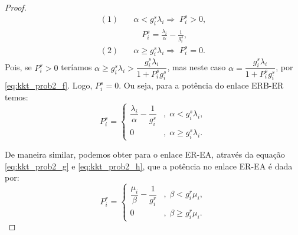\begin{proof}
    \begin{align}
    (1)\quad     &\alpha < g_i^s\lambda_i \Rightarrow\; P_i^s > 0 ,\\
                &\quad P_i^s = \frac{\lambda_i}{\alpha} - \frac{1}{g_i^s},\\
    (2)\quad     &\alpha \geq g_i^s\lambda_i \Rightarrow\; P_i^s = 0.
    \end{align}
    Pois, se $P_i^s > 0$ teríamos $\alpha \geq g_i^s\lambda_i > \dfrac{g_i^s\lambda_i}{1 + P_i^sg_i^s}$, mas neste caso $\alpha =\dfrac{g_i^s\lambda_i}{1 + P_i^sg_i^s}$, por \eqref{eq:kkt_prob2_f}. Logo, $P_i^s = 0$. Ou seja, para a potência do enlace \ac{ERB}-\ac{ER} temos:
    \begin{equation}\label{eq_pot_sr}
    P_i^s=
        \begin{cases}
          \dfrac{\lambda_i}{\alpha} - \dfrac{1}{g_i^s} &,\; \alpha < g_i^s\lambda_i,\\
          0 &,\; \alpha \geq g_i^s\lambda_i.
        \end{cases}
    \end{equation}

    De maneira similar, podemos obter para o enlace \ac{ER}-\ac{EA}, através da equação \eqref{eq:kkt_prob2_g} e \eqref{eq:kkt_prob2_h}, que 
    a potência no enlace \ac{ER}-\ac{EA} é dada por:
    \begin{equation}\label{eq:pot_rd}
    P_i^r=
        \begin{cases}         
            \dfrac{\mu_i}{\beta} - \dfrac{1}{g_i^r} &,\; \beta < g_i^r\mu_i,\\
            0 &,\; \beta \geq g_i^r\mu_i.
        \end{cases}
    \end{equation}


\end{proof}
